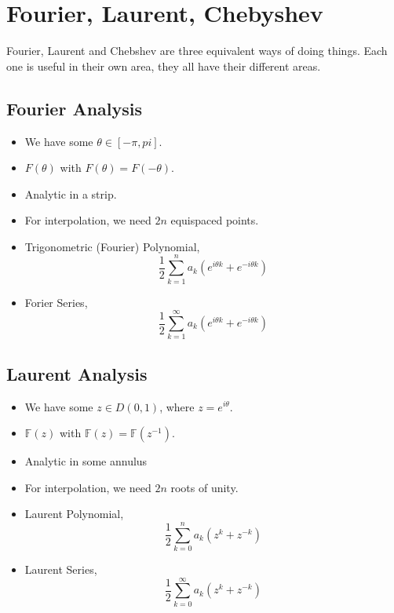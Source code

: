
\section{Fourier, Laurent, Chebyshev}
Fourier, Laurent and Chebshev are three equivalent ways of doing things. Each one is useful in their own area, they all have their different areas.

\subsection{Fourier Analysis}
\begin{itemize}
  \item We have some $\theta \in [-\pi, pi]$.
  \item $F(\theta)$ with $F(\theta) = F(-\theta)$.
  \item Analytic in a strip.
  \item For interpolation, we need $2n$ equispaced points.
  \item Trigonometric (Fourier) Polynomial,
  $$ \frac{1}{2}\sum_{k=1}^n a_k (e^{i \theta k} + e^{-i \theta k}) $$
  \item Forier Series,
  $$ \frac{1}{2}\sum_{k=1}^\infty a_k (e^{i \theta k} + e^{-i \theta k}) $$
\end{itemize}

\subsection{Laurent Analysis}
\begin{itemize}
  \item We have some $z \in D(0, 1)$, where $z = e^{i\theta}$.
  \item $\mathbb{F}(z)$ with $\mathbb{F}(z) = \mathbb{F}(z^{-1})$.
  \item Analytic in some annulus
  \item For interpolation, we need $2n$ roots of unity.
  \item Laurent Polynomial,
  $$ \frac{1}{2}\sum_{k=0}^n a_k (z^k + z^{-k}) $$
  \item Laurent Series,
  $$ \frac{1}{2}\sum_{k=0}^\infty a_k (z^k + z^{-k}) $$
\end{itemize}

